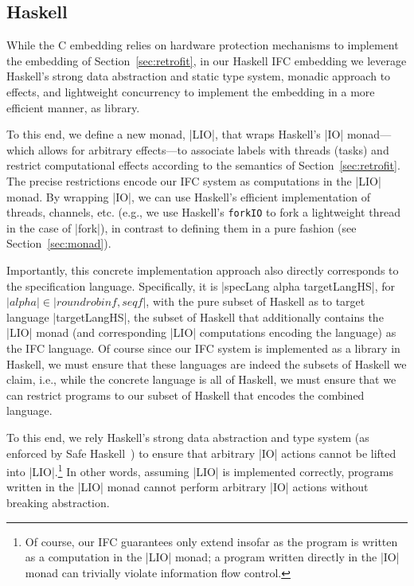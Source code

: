 \subsection{Haskell}
\label{sec:real:hs}
While the C embedding relies on hardware protection mechanisms to
implement the embedding of Section~\ref{sec:retrofit}, in our Haskell
IFC embedding we leverage Haskell's strong data abstraction and static
type system, monadic approach to effects, and lightweight concurrency
to implement the embedding in a more efficient manner, as library.

To this end, we define a new monad, |LIO|, that wraps Haskell's |IO|
monad---which allows for arbitrary effects---to associate labels with
threads (tasks) and restrict computational effects according to the
semantics of Section~\ref{sec:retrofit}.
%
The precise restrictions encode our IFC system as computations in the
|LIO| monad.
%
By wrapping |IO|, we can use Haskell's efficient implementation of
threads, channels, etc. (e.g., we use Haskell's \texttt{forkIO} to
fork a lightweight thread in the case of |fork|), in contrast to
defining them in a pure fashion (see Section~\ref{sec:monad}).

Importantly, this concrete implementation approach also directly
corresponds to the specification language.
%
Specifically, it is |specLang alpha targetLangHS|, for $|alpha| \in
|{roundrobinf, seqf}|$, with the pure subset of Haskell as to target
language |targetLangHS|, the subset of Haskell that additionally
contains the |LIO| monad (and corresponding |LIO| computations
encoding the language) as the IFC language.
%
Of course since our IFC system is implemented as a library in Haskell,
we must ensure that these languages are indeed the subsets of Haskell
we claim, i.e., while the concrete language is all of Haskell, we must
ensure that we can restrict programs to our subset of Haskell that
encodes the combined language.
%

To this end, we rely Haskell's strong data abstraction and type system
(as enforced by Safe Haskell~\cite{Terei:2012:SH:2364506.2364524}) to
ensure that arbitrary |IO| actions cannot be lifted into
|LIO|.\footnote{
Of course, our IFC guarantees only extend insofar as the program is
written as a computation in the |LIO| monad; a program written
directly in the |IO| monad can trivially violate information flow
control.
}
%
In other words, assuming |LIO| is implemented correctly, programs
written in the |LIO| monad cannot perform arbitrary |IO| actions
without breaking abstraction.
 
